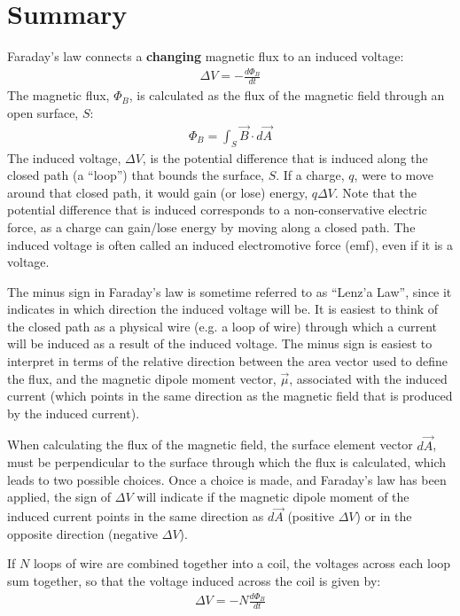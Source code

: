 \newpage
\section{Summary}

\begin{chapterSummary}
Faraday's law connects a \textbf{changing} magnetic flux to an induced voltage:
\begin{align*}
\Delta V = -\frac{d\Phi_B}{dt}
\end{align*}
The magnetic flux, $\Phi_B$, is calculated as the flux of the magnetic field through an open surface, $S$:
\begin{align*}
\Phi_B = \int_S \vec B\cdot d\vec A
\end{align*}
The induced voltage, $\Delta V$, is the potential difference that is induced along the closed path (a ``loop'') that bounds the surface, $S$. If a charge, $q$, were to move around that closed path, it would gain (or lose) energy, $q\Delta V$. Note that the potential difference that is induced corresponds to a non-conservative electric force, as a charge can gain/lose energy by moving along a closed path. The induced voltage is often called an induced electromotive force (emf), even if it is a voltage.

The minus sign in Faraday's law is sometime referred to as ``Lenz'a Law'', since it indicates in which direction the induced voltage will be. It is easiest to think of the closed path as a physical wire (e.g. a loop of wire) through which a current will be induced as a result of the induced voltage. The minus sign is easiest to interpret in terms of the relative direction between the area vector used to define the flux, and the magnetic dipole moment vector, $\vec \mu$, associated with the induced current (which points in the same direction as the magnetic field that is produced by the induced current). 

When calculating the flux of the magnetic field, the surface element vector $d\vec A$, must be perpendicular to the surface through which the flux is calculated, which leads to two possible choices. Once a choice is made, and Faraday's law has been applied, the sign of $\Delta V$ will indicate if the magnetic dipole moment of the induced current points in the same direction as $d\vec A$ (positive $\Delta V$) or in the opposite direction (negative $\Delta V$).

If $N$ loops of wire are combined together into a coil, the voltages across each loop sum together, so that the voltage induced across the coil is given by:
\begin{align*}
\Delta V = -N\frac{d\Phi_B}{dt}
\end{align*}


\end{chapterSummary}
